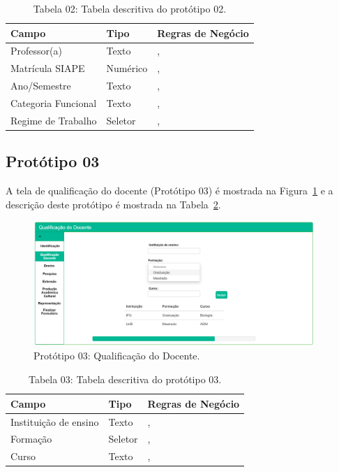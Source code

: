 \begin{table}[H]
\centering
\caption[Tabela 02: Tabela descritiva do protótipo 02.]{Tabela 02: Tabela descritiva do protótipo 02.}
\label{tab:prot02}
\begin{tabular}{@{}lll@{}}
\toprule
Campo               & Tipo     &  Regras de Negócio                     \\ \midrule
Professor(a)        & Texto    &    \nameref{rn002}, \nameref{rn004}    \\
Matrícula SIAPE     & Numérico &    \nameref{rn002}, \nameref{rn004}    \\
Ano/Semestre        & Texto    &    \nameref{rn002}, \nameref{rn004}    \\
Categoria Funcional & Texto    &    \nameref{rn003}, \nameref{rn004}    \\
Regime de Trabalho  & Seletor  &    \nameref{rn002}, \nameref{rn004}    \\ \bottomrule
\end{tabular}
\end{table}


\newpage
\subsection{Protótipo 03}\label{prototipo03}
A tela de qualificação do docente (Protótipo 03) é mostrada na Figura~\ref{fig:prot03} e a descrição deste protótipo é mostrada na Tabela~\ref{tab:prot03}.


\begin{figure}[H]
    \centering
    \includegraphics[width=0.95\textwidth]{img/3pagina_qualificacao_do_docente.png}
    \caption[Protótipo 03: Qualificação do Docente]{Protótipo 03: Qualificação do Docente.}
    \label{fig:prot03}
\end{figure}


\begin{table}[H]
\centering
\caption[Tabela 03: Tabela descritiva do protótipo 03.]{Tabela 03: Tabela descritiva do protótipo 03.}
\label{tab:prot03}
\begin{tabular}{@{}lll@{}}
\toprule
Campo                   & Tipo     &  Regras de Negócio                     \\ \midrule
Instituição de ensino   & Texto    &    \nameref{rn005}, \nameref{rn006}    \\
Formação                & Seletor  &    \nameref{rn005}, \nameref{rn006}    \\
Curso                   & Texto    &    \nameref{rn005}, \nameref{rn006}    \\ \bottomrule
\end{tabular}
\end{table}

